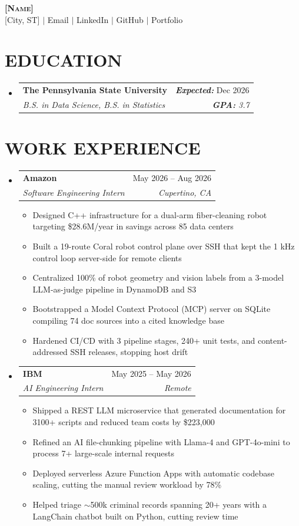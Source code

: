 \documentclass[letterpaper,11pt]{article}
\makeatletter
\newcommand{\resumeItem}[1]{
  \item\small{
    {#1 \vspace{-4pt}}
  }
}
\newcommand{\resumeSubheading}[4]{
  \item
    \begin{tabular*}{0.97\textwidth}[t]{l@{\extracolsep{\fill}}r}
      \textbf{#1} & #2 \\
      \textit{\small#3} & \textit{\small #4} \\
    \end{tabular*}\vspace{-7pt}
}
\newcommand{\resumeSubHeadingListStart}{\begin{itemize}[leftmargin=0.15in, label={}]}
\newcommand{\resumeSubHeadingListEnd}{\end{itemize}}
\newcommand{\resumeItemListStart}{\begin{itemize}}
\newcommand{\resumeItemListEnd}{\end{itemize}\vspace{-6pt}}
\makeatother
\begin{document}
\begin{center}
    \textbf{\Huge \scshape [Name]} \\ \vspace{1pt}
    \small [City, ST] $|$ Email \faEnvelope $|$
    LinkedIn \faLinkedin $|$
    GitHub \faGithub $|$
    Portfolio \raisebox{-0.12em}{\scalebox{1.45}{$\blacktriangle$}}
\end{center}


\section{\textbf{EDUCATION}}
  \resumeSubHeadingListStart
    \resumeSubheading
    {The Pennsylvania State University}{\textbf{\textit{Expected:}} Dec 2026}
      {B.S. in Data Science, B.S. in Statistics}{\textbf{\textit{GPA:}} 3.7}
  \resumeSubHeadingListEnd

\section{\textbf{WORK EXPERIENCE}}
  \resumeSubHeadingListStart
  \resumeSubheading
      {Amazon}{May 2026 -- Aug 2026}
      {Software Engineering Intern}{Cupertino, CA}
      \resumeItemListStart
        \resumeItem{Designed C++ infrastructure for a dual-arm fiber-cleaning robot targeting \$28.6M/year in savings across 85 data centers}
        \resumeItem{Built a 19-route Coral robot control plane over SSH that kept the 1 kHz control loop server-side for remote clients}
        \resumeItem{Centralized 100\% of robot geometry and vision labels from a 3-model LLM-as-judge pipeline in DynamoDB and S3}
        \resumeItem{Bootstrapped a Model Context Protocol (MCP) server on SQLite compiling 74 doc sources into a cited knowledge base}
        \resumeItem{Hardened CI/CD with 3 pipeline stages, 240+ unit tests, and content-addressed SSH releases, stopping host drift}
      \resumeItemListEnd
    \resumeSubheading
      {IBM}{May 2025 -- May 2026}
      {AI Engineering Intern}{Remote}
      \resumeItemListStart
        \resumeItem{Shipped a REST LLM microservice that generated documentation for 3100+ scripts and reduced team costs by \$223,000}
        \resumeItem{Refined an AI file-chunking pipeline with Llama-4 and GPT-4o-mini to process 7+ large-scale internal requests}
        \resumeItem{Deployed serverless Azure Function Apps with automatic codebase scaling, cutting the manual review workload by 78\%}
        \resumeItem{Helped triage $\sim$500k criminal records spanning 20+ years with a LangChain chatbot built on Python, cutting review time}
      \resumeItemListEnd
  \resumeSubHeadingListEnd
\end{document}
